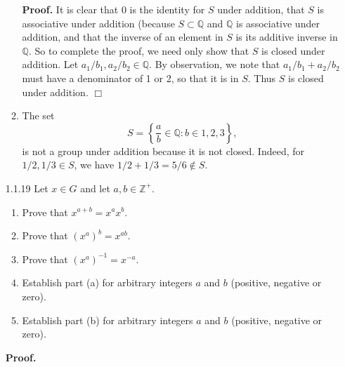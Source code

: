 \documentclass[9pt]{article}
\newcommand{\qed}{\hfill \ensuremath{\Box}}
\newcommand{\Z}{\mathbb{Z}}
\newcommand{\Q}{\mathbb{Q}}
\begin{document}
\begin{enumerate}
\begin{enumerate}
               \textbf{Proof.} It is clear that 0 is the identity for $S$ under
               addition, that $S$ is associative under addition (because
               $S \subset \Q$ and $\Q$ is associative under addition, and that
               the inverse of an element in $S$ is its additive inverse in $\Q$.
               So to complete the proof, we need only show that $S$ is closed
               under addition. Let $a_1/b_1, a_2/b_2 \in \Q$. By observation, we
               note that $a_1/b_1 + a_2/b_2$ must have a denominator of 1 or 2,
               so that it is in $S$. Thus $S$ is closed under addition. \qed
         \item The set
               $$S = \left\{\frac{a}{b} \in \Q : b \in {1, 2, 3} \right\},$$
               is not a group under addition because it is not closed. Indeed,
               for $1/2, 1/3 \in S$, we have $1/2 + 1/3 = 5/6 \notin S$.
      \end{enumerate}
   \item[1.1.19]  Let $x \in G$ and let $a, b \in \Z^+$.
                  \begin{enumerate}
                     \item Prove that $x^{a+b} = x^ax^b$.
                     \item Prove that $(x^a)^b = x^{ab}$.
                     \item Prove that $(x^a)^{-1} = x^{-a}$.
                     \item Establish part (a) for arbitrary integers $a$ and $b$
                           (positive, negative or zero).
                     \item Establish part (b) for arbitrary integers $a$ and $b$
                           (positive, negative or zero).
                  \end{enumerate}
               
      \textbf{Proof.}
      

\end{enumerate}
\end{document}
